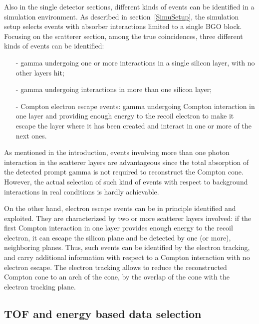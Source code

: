 Also in the single detector sections, different kinds of events can be identified in a simulation environment.
As described in section~\ref{SimuSetup}, the simulation setup selects events with absorber interactions limited to a single BGO block.
Focusing on the scatterer section, among the true coincidences, three different kinds of events can be identified:
\begin{itemize}
\item[-] gamma undergoing one or more interactions in a single silicon layer, with no other layers hit;
\item[-] gamma undergoing interactions in more than one silicon layer;
\item[-] Compton electron escape events: gamma undergoing Compton interaction in one layer and providing enough energy to the recoil electron to make it escape the layer where it has been created and interact in one or more of the next ones.
\end{itemize}

As mentioned in the introduction, events involving more than one photon interaction in the scatterer layers are advantageous since the total absorption of the detected prompt gamma is not required to reconstruct the Compton cone. However, the actual selection of such kind of events with respect to background interactions in real conditions is hardly achievable.

On the other hand, electron escape events can be in principle identified and exploited. They are characterized by two or more scatterer layers involved: if the first Compton interaction in one layer provides enough energy to the recoil electron, it can escape the silicon plane and be detected by one (or more), neighboring planes. Thus, such events can be identified by the electron tracking, and carry additional information with respect to a Compton interaction with no electron escape. The electron tracking allows to reduce the reconstructed Compton cone to an arch of the cone, by the overlap of the cone with the electron tracking plane.      

\subsection{TOF and energy based data selection}
\label{MatMeth::TOF_Ecut}


